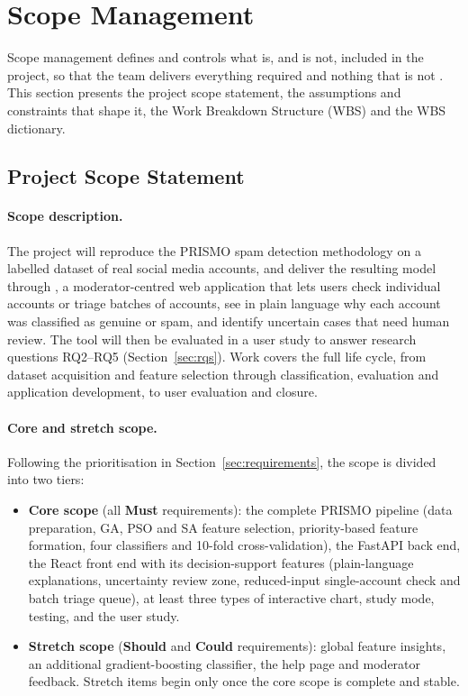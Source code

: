 \section{Scope Management}\label{sec:scope}

Scope management defines and controls what is, and is not, included in the project, so that the team delivers everything required and nothing that is not \parencite{pmi2021pmbok}. This section presents the project scope statement, the assumptions and constraints that shape it, the Work Breakdown Structure (WBS) and the WBS dictionary.

\subsection{Project Scope Statement}\label{sec:scope-statement}

\paragraph{Scope description.} The project will reproduce the PRISMO spam detection methodology \parencite{agrawal2018prismo} on a labelled dataset of real social media accounts, and deliver the resulting model through \projectname{}, a moderator-centred web application that lets users check individual accounts or triage batches of accounts, see in plain language why each account was classified as genuine or spam, and identify uncertain cases that need human review. The tool will then be evaluated in a user study to answer research questions RQ2--RQ5 (Section~\ref{sec:rqs}). Work covers the full life cycle, from dataset acquisition and feature selection through classification, evaluation and application development, to user evaluation and closure.

\paragraph{Core and stretch scope.} Following the prioritisation in Section~\ref{sec:requirements}, the scope is divided into two tiers:

\begin{itemize}[nosep]
  \item \textbf{Core scope} (all \textbf{Must} requirements): the complete PRISMO pipeline (data preparation, GA, PSO and SA feature selection, priority-based feature formation, four classifiers and 10-fold cross-validation), the FastAPI back end, the React front end with its decision-support features (plain-language explanations, uncertainty review zone, reduced-input single-account check and batch triage queue), at least three types of interactive chart, study mode, testing, and the user study.
  \item \textbf{Stretch scope} (\textbf{Should} and \textbf{Could} requirements): global feature insights, an additional gradient-boosting classifier, the help page and moderator feedback. Stretch items begin only once the core scope is complete and stable.
\end{itemize}

